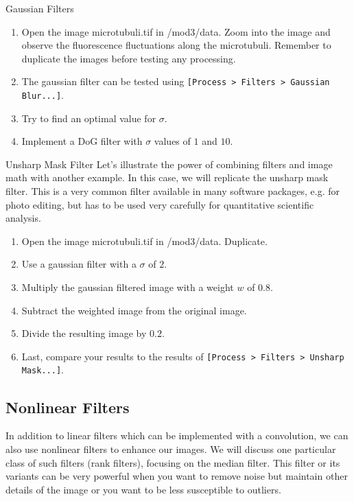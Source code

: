 \begin{taskbox}{Gaussian Filters}
\begin{enumerate}
	\item Open the image microtubuli.tif in /mod3/data. Zoom into the image and observe the fluorescence fluctuations along the microtubuli. Remember to duplicate the images before testing any processing.
	\item The gaussian filter can be tested using \texttt{[Process > Filters > Gaussian Blur...]}. 
	\item Try to find an optimal value for $\sigma$.
	\item Implement a DoG filter with $\sigma$ values of $1$ and $10$.
	\end{enumerate}
\end{taskbox}

\begin{taskbox}{Unsharp Mask Filter}
Let's illustrate the power of combining filters and image math with another example. In this case, we will replicate the unsharp mask filter. This is a very common filter available in many software packages, e.g. for photo editing, but has to be used very carefully for quantitative scientific analysis.

\begin{enumerate}
	\item Open the image microtubuli.tif in /mod3/data. Duplicate.
	\item Use a gaussian filter with a $\sigma$ of $2$. 
	\item Multiply the gaussian filtered image with a weight $w$ of $0.8$.
	\item Subtract the weighted image from the original image.
	\item Divide the resulting image by $0.2$. 
	\item Last, compare your results to the results of \texttt{[Process > Filters > Unsharp Mask...]}.
	\end{enumerate}
\end{taskbox}

\subsection{Nonlinear Filters}
In addition to linear filters which can be implemented with a convolution, we can also use nonlinear filters to enhance our images. We will discuss one particular class of such filters (rank filters), focusing on the median filter. This filter or its variants can be very powerful when you want to remove noise but maintain other details of the image or you want to be less susceptible to outliers. 

